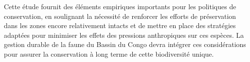 \documentclass[
]{book}
\begin{document}
Cette étude fournit des éléments empiriques importants pour les politiques de conservation, en soulignant la nécessité de renforcer les efforts de préservation dans les zones encore relativement intacts et de mettre en place des stratégies adaptées pour minimiser les effets des pressions anthropiques sur ces espèces. La gestion durable de la faune du Bassin du Congo devra intégrer ces considérations pour assurer la conservation à long terme de cette biodiversité unique.
\end{document}
